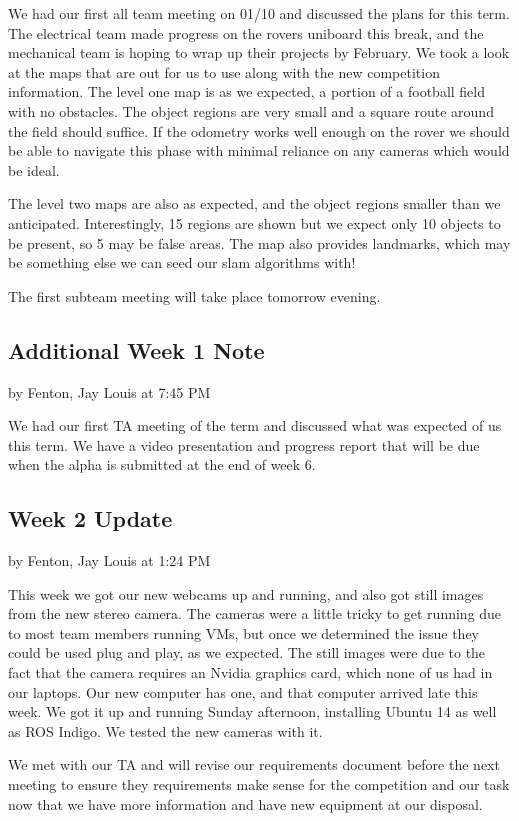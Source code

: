 \documentclass[10pt, oneside,onecolumn]{IEEEtran}
\begin{document}
We had our first all team meeting on 01/10 and discussed the plans for this term. The electrical team made progress on the rovers uniboard this break, and the mechanical team is hoping to wrap up their projects by February. We took a look at the maps that are out for us to use along with the new competition information. The level one map is as we expected, a portion of a football field with no obstacles. The object regions are very small and a square route around the field should suffice. If the odometry works well enough on the rover we should be able to navigate this phase with minimal reliance on any cameras which would be ideal.

The level two maps are also as expected, and the object regions smaller than we anticipated. Interestingly, 15 regions are shown but we expect only 10 objects to be present, so 5 may be false areas. The map also provides landmarks, which may be something else we can seed our slam algorithms with!

The first subteam meeting will take place tomorrow evening.

\subsection{Additional Week 1 Note}
by Fenton, Jay Louis at 7:45 PM

We had our first TA meeting of the term and discussed what was expected of us this term. We have a video presentation and progress report that will be due when the alpha is submitted at the end of week 6. 

\subsection{Week 2 Update}
by Fenton, Jay Louis at 1:24 PM

This week we got our new webcams up and running, and also got still images from the new stereo camera. The cameras were a little tricky to get running due to most team members running VMs, but once we determined the issue they could be used plug and play, as we expected. The still images were due to the fact that the camera requires an Nvidia graphics card, which none of us had in our laptops. Our new computer has one, and that computer arrived late this week. We got it up and running Sunday afternoon, installing Ubuntu 14 as well as ROS Indigo. We tested the new cameras with it. 

We met with our TA and will revise our requirements document before the next meeting to ensure they requirements make sense for the competition and our task now that we have more information and have new equipment at our disposal. 
\end{document}
